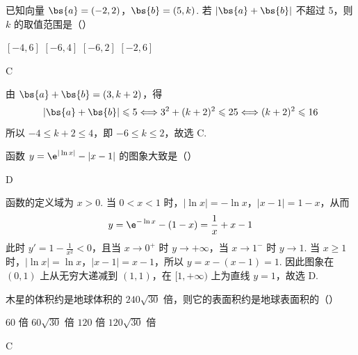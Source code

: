 \begin{problem}
已知向量 \(\bs{a} = (-2, 2)\)，\(\bs{b} = (5, k)\). 若 \(\left|\bs{a} + \bs{b}\right|\) 不超过 5，则 \(k\) 的取值范围是（\quad）

\choices
    {\([-4, 6]\)}
    {\([-6, 4]\)}
    {\([-6, 2]\)}
    {\([-2,6]\)}
\end{problem}

\begin{answer}
C
\end{answer}

\begin{solution}
由 \(\bs{a}+\bs{b}=(3,k+2)\)，得
\[
\left|\bs{a}+\bs{b}\right|\leqslant5\Longleftrightarrow 3^2+(k+2)^2\leqslant25\Longleftrightarrow (k+2)^2\leqslant16
\]
所以 \(-4\leqslant k+2\leqslant4\)，即 \(-6\leqslant k\leqslant2\)，故选 C.
\end{solution}

\begin{problem}
函数 \( y = \e^{|\ln x|} - |x - 1| \) 的图象大致是（\quad）

    {}
    {}
    {}
\end{problem}

\begin{answer}
D
\end{answer}

\begin{solution}
函数的定义域为 \(x>0\). 当 \(0<x<1\) 时，\(|\ln x|=-\ln x\)，\(|x-1|=1-x\)，从而
\[
y=\e^{-\ln x}-(1-x)=\frac1x+x-1
\]
此时 \(y'=1-\frac1{x^2}<0\)，且当 \(x\to0^+\) 时 \(y\to+\infty\)，当 \(x\to1^-\) 时 \(y\to1\). 当 \(x\geqslant1\) 时，\(|\ln x|=\ln x\)，\(|x-1|=x-1\)，所以 \(y=x-(x-1)=1\). 因此图象在 \((0,1)\) 上从无穷大递减到 \((1,1)\)，在 \([1,+\infty)\) 上为直线 \(y=1\)，故选 D.
\end{solution}

\begin{problem}
木星的体积约是地球体积的 \(240 \sqrt{30}\) 倍，则它的表面积约是地球表面积的（\quad）

\choices
    {\(60\) 倍}
    {\(60 \sqrt{30}\) 倍}
    {\(120\) 倍}
    {\(120 \sqrt{30}\) 倍}
\end{problem}

\begin{answer}
C
\end{answer}

